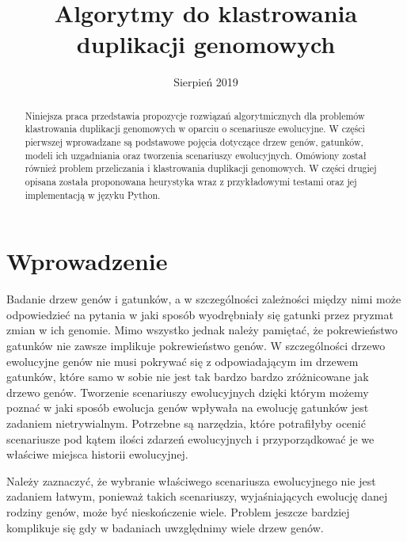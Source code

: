 \documentclass[licencjacka]{pracamgr}
\title{Algorytmy do klastrowania duplikacji genomowych}
\date{Sierpień 2019}
\begin{document}
\maketitle


\begin{abstract}
   Niniejsza praca przedstawia propozycje rozwiązań algorytmicznych dla problemów klastrowania duplikacji genomowych w oparciu o scenariusze ewolucyjne. W części pierwszej wprowadzane są podstawowe pojęcia dotyczące drzew genów, gatunków, modeli ich uzgadniania oraz tworzenia scenariuszy ewolucyjnych. Omówiony został również problem przeliczania i klastrowania duplikacji genomowych. W części drugiej opisana została proponowana heurystyka wraz z przykładowymi testami oraz jej implementacją w języku Python.
\end{abstract}


\renewcommand{\contentsname}{Spis Treści}
\tableofcontents

\chapter*{Wprowadzenie}


Badanie drzew genów i gatunków, a w szczególności zależności między nimi może odpowiedzieć na pytania w jaki sposób wyodrębniały się gatunki przez pryzmat zmian w ich genomie. Mimo wszystko jednak należy pamiętać, że pokrewieństwo gatunków nie zawsze implikuje pokrewieństwo genów. W szczególności drzewo ewolucyjne genów nie musi pokrywać się z odpowiadającym im drzewem gatunków, które samo w sobie nie jest tak bardzo bardzo zróżnicowane jak drzewo genów. Tworzenie scenariuszy ewolucyjnych dzięki którym możemy poznać w jaki sposób ewolucja genów wpływała na ewolucję gatunków jest zadaniem nietrywialnym. Potrzebne są narzędzia, które potrafiłyby ocenić scenariusze pod kątem ilości zdarzeń ewolucyjnych i przyporządkować je we właściwe miejsca historii ewolucyjnej.

Należy zaznaczyć, że wybranie właściwego scenariusza ewolucyjnego nie jest zadaniem łatwym, ponieważ takich scenariuszy, wyjaśniających ewolucję danej rodziny genów, może być nieskończenie wiele. Problem jeszcze bardziej komplikuje się gdy w badaniach uwzględnimy wiele drzew genów.
\end{document}
